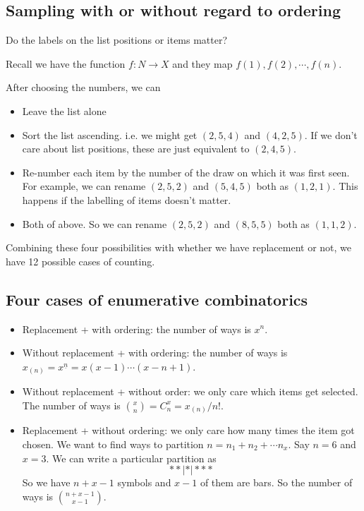 \documentclass[a4paper]{article}
\begin{document}
\subsection{Sampling with or without regard to ordering}
Do the labels on the list positions or items matter?

Recall we have the function $f: N\to X$ and they map $f(1), f(2), \cdots, f(n)$.

After choosing the numbers, we can
\begin{itemize}
  \item Leave the list alone
  \item Sort the list ascending. i.e. we might get $(2, 5, 4)$ and $(4, 2, 5)$. If we don't care about list positions, these are just equivalent to $(2, 4, 5)$.
  \item Re-number each item by the number of the draw on which it was first seen. For example, we can rename $(2, 5, 2)$ and $(5, 4, 5)$ both as $(1, 2, 1)$. This happens if the labelling of items doesn't matter.
  \item Both of above. So we can rename $(2, 5, 2)$ and $(8, 5, 5)$ both as $(1, 1, 2)$.
\end{itemize}

Combining these four possibilities with whether we have replacement or not, we have 12 possible cases of counting.

\subsection{Four cases of enumerative combinatorics}
\begin{itemize}
  \item Replacement + with ordering: the number of ways is $x^n$.
  \item Without replacement + with ordering: the number of ways is $x_{(n)} = x^{\underline{n}} = x(x - 1)\cdots (x - n + 1)$.
  \item Without replacement + without order: we only care which items get selected. The number of ways is $\binom{x}{n} = C^x_n = x_{(n)}/n!$.
  \item Replacement + without ordering: we only care how many times the item got chosen. We want to find ways to partition $n = n_1 + n_2 + \cdots n_x$. Say $n = 6$ and $x = 3$. We can write a particular partition as
    \[
      **|*|***
    \]
  So we have $n + x - 1$ symbols and $x - 1$ of them are bars. So the number of ways is $\binom{n + x - 1}{x - 1}$.
\end{itemize}
\end{document}
